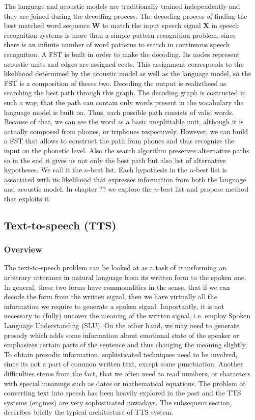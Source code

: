 The language and acoustic models are traditionally trained independently and they are joined during the decoding process.
The decoding process of finding the best matched word sequence $\textbf{W}$ to match the input speech signal $\textbf{X}$ in speech recognition systems is more than a simple pattern recognition problem, since there is an infinite number of word patterns to search in continuous speech recognition.
A FST is built in order to make the decoding.
Its nodes represent acoustic units and edges are assigned costs.
This assignment corresponds to the likelihood determined by the acoustic model as well as the language model, so the FST is a composition of theses two.
Decoding the output is realiztheed as searching the best path through this graph.
\linebreak\linebreak
The decoding graph is costructed in such a way, that the path can contain only words present in the vocabulary the language model is built on.
Thus, each possible path consists of valid words.
Because of that, we can see the word as a basic unsplittable unit, although it is actually composed from phones, or triphones respectively.
However, we can build a FST that allows to construct the path from phones and thus recognize the input on the phonetic level.
Also the search algorithm preserves alternative paths so in the end it gives us not only the best path but also list of alternative hypotheses.
We call it the $n$-best list.
Each hypothesis in the $n$-best list is associated with its likelihood that expresses information from both the language and acoustic model.
In chapter ?? we explore the $n$-best list and propose method that exploits it.
\label{ASR-phn}
\subsection{Text-to-speech (TTS)}
\subsubsection*{Overview\cite{taylor2009text}}
The text-to-speech problem can be looked at as a task of transforming an arbitrary utterance in natural language from its written form to the spoken one.
In general, these two forms have commonalities in the sense, that if we can decode the form from the written signal, then we have virtually all the information we require to generate a spoken signal.
Importantly, it is not necessary to (fully) uncover the meaning of the written signal, i.e. employ Spoken Language Understanding (SLU).
On the other hand, we may need to generate prosody which adds some information about emotional state of the speaker or emphasizes certain parts of the sentence and thus changing the meaning slightly.
To obtain prosodic information, sophisticated techniques need to be involved, since its not a part of common written text, except some punctuation.
Another difficulties stems from the fact, that we often need to read numbers, or characters with special meanings such as dates or mathematical equations.
The problem of converting text into speech has been heavily explored in the past and the TTS systems (engines) are very sophisticated nowadays.
The subsequent section, describes briefly the typical architecture of TTS system.
